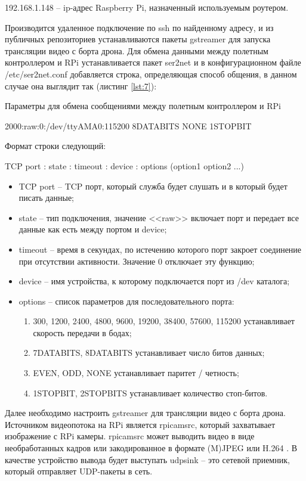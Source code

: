 192.168.1.148 -- ip-адрес Raspberry Pi, назначенный используемым роутером.

Производится удаленное подключение по ssh по найденному адресу, и из публичных репозиториев устанавливаются пакеты gstreamer для запуска трансляции видео с борта дрона.
Для обмена данными между полетным контроллером и RPi устанавливается пакет ser2net и в конфигурационном файле /etc/ser2net.conf добавляется строка, определяющая способ общения, в данном случае она выглядит так (листинг \ref{lst:7}):
\begin{Program}[H]
\caption{Параметры для обмена сообщениями между полетным контроллером и RPi} \label{lst:7}
	\begin{MyCode}
	2000:raw:0:/dev/ttyAMA0:115200 8DATABITS NONE 1STOPBIT
	\end{MyCode}
\end{Program}
Формат строки следующий:

TCP port : state : timeout : device : options (option1 option2 ...)

\begin{itemize}
	\item TCP port -- TCP порт, который служба будет слушать и в который будет писать данные;
	\item state -- тип подключения, значение <<raw>> включает порт и передает все данные как есть между портом и device;
	\item timeout -- время в секундах, по истечению которого порт закроет соединение при отсутствии активности. Значение 0 отключает эту функцию;
	\item device -- имя устройства, к которому подключается порт из /dev каталога;
	\item options -- список параметров для последовательного порта:
	\begin{enumerate}
		 \item 300, 1200, 2400, 4800, 9600, 19200, 38400, 57600, 115200 устанавливает скорость передачи в бодах;
		\item 7DATABITS, 8DATABITS устанавливает число битов данных;
		\item EVEN, ODD, NONE устанавливает паритет / четность;
		\item 1STOPBIT, 2STOPBITS устанавливает количество стоп-битов.
	\end{enumerate}
\end{itemize}

Далее необходимо настроить gstreamer для трансляции видео с борта дрона. Источником видеопотока на RPi является rpi\-cam\-src, который захватывает изображение с RPi камеры. rpi\-cam\-src может выводить видео в виде необработанных кадров или закодированное в формате (M)JPEG или H.264 \cite{gstreamer1}. В качестве устройство вывода будет выступать udpsink -- это сетевой приемник, который отправляет UDP-пакеты в сеть.

